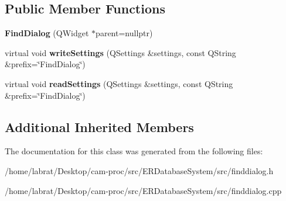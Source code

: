 \subsection*{Public Member Functions}
\begin{DoxyCompactItemize}
\item 
{\bfseries Find\+Dialog} (Q\+Widget $\ast$parent=nullptr)\hypertarget{classFindDialog_aa5ec2e3278ccf89baeb33dc396ea1f79}{}\label{classFindDialog_aa5ec2e3278ccf89baeb33dc396ea1f79}

\item 
virtual void {\bfseries write\+Settings} (Q\+Settings \&settings, const Q\+String \&prefix=\char`\"{}Find\+Dialog\char`\"{})\hypertarget{classFindDialog_a8d54b1576e6325b41e5989fa2cec0d26}{}\label{classFindDialog_a8d54b1576e6325b41e5989fa2cec0d26}

\item 
virtual void {\bfseries read\+Settings} (Q\+Settings \&settings, const Q\+String \&prefix=\char`\"{}Find\+Dialog\char`\"{})\hypertarget{classFindDialog_adcb3b60f3a1a4a41f7edddf7b203ba44}{}\label{classFindDialog_adcb3b60f3a1a4a41f7edddf7b203ba44}

\end{DoxyCompactItemize}
\subsection*{Additional Inherited Members}


The documentation for this class was generated from the following files\+:\begin{DoxyCompactItemize}
\item 
/home/labrat/\+Desktop/cam-\/proc/src/\+E\+R\+Database\+System/src/finddialog.\+h\item 
/home/labrat/\+Desktop/cam-\/proc/src/\+E\+R\+Database\+System/src/finddialog.\+cpp\end{DoxyCompactItemize}
